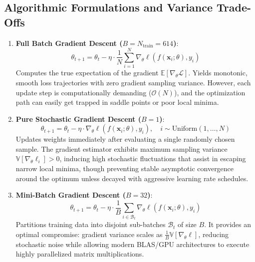\documentclass[12pt]{article}
\begin{document}
\subsection{Algorithmic Formulations and Variance Trade-Offs}
\begin{enumerate}
    \item \textbf{Full Batch Gradient Descent ($B = N_{\text{train}} = 614$)}:
    \begin{equation}
    \theta_{t+1} = \theta_t - \eta \cdot \frac{1}{N} \sum_{i=1}^N \nabla_\theta \ell(f(\mathbf{x}_i; \theta), y_i)
    \end{equation}
    Computes the true expectation of the gradient $\mathbb{E}[\nabla_\theta \mathcal{L}]$. Yields monotonic, smooth loss trajectories with zero gradient sampling variance. However, each update step is computationally demanding ($\mathcal{O}(N)$), and the optimization path can easily get trapped in saddle points or poor local minima.

    \item \textbf{Pure Stochastic Gradient Descent ($B = 1$)}:
    \begin{equation}
    \theta_{t+1} = \theta_t - \eta \cdot \nabla_\theta \ell(f(\mathbf{x}_i; \theta), y_i), \quad i \sim \text{Uniform}(1, \dots, N)
    \end{equation}
    Updates weights immediately after evaluating a single randomly chosen sample. The gradient estimator exhibits maximum sampling variance $\mathbb{V}[\nabla_\theta \ell_i] > 0$, inducing high stochastic fluctuations that assist in escaping narrow local minima, though preventing stable asymptotic convergence around the optimum unless decayed with aggressive learning rate schedules.

    \item \textbf{Mini-Batch Gradient Descent ($B = 32$)}:
    \begin{equation}
    \theta_{t+1} = \theta_t - \eta \cdot \frac{1}{B} \sum_{i \in \mathcal{B}_t} \nabla_\theta \ell(f(\mathbf{x}_i; \theta), y_i)
    \end{equation}
    Partitions training data into disjoint sub-batches $\mathcal{B}_t$ of size $B$. It provides an optimal compromise: gradient variance scales as $\frac{1}{B} \mathbb{V}[\nabla_\theta \ell]$, reducing stochastic noise while allowing modern BLAS/GPU architectures to execute highly parallelized matrix multiplications.
\end{enumerate}
\end{document}
